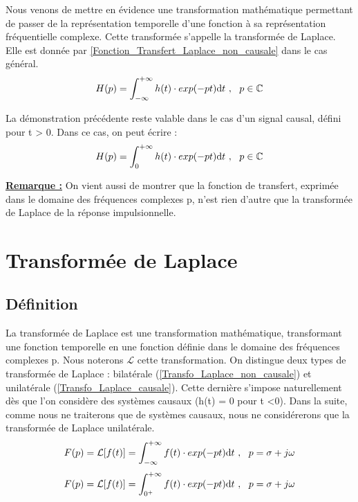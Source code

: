 	Nous venons de mettre en évidence une transformation mathématique permettant de passer de la représentation temporelle d'une fonction à sa représentation fréquentielle complexe. Cette transformée s'appelle la transformée de Laplace. Elle est donnée par \ref{Fonction_Transfert_Laplace_non_causale} dans le cas général.
	\begin{equation}\label{Fonction_Transfert_Laplace_non_causale}
	H(p) = \int_{-\infty}^{+\infty} h(t) \cdot exp(-pt)	\mathrm{d} t~,~~p \in \mathbb{C}	
	\end{equation}	
	
	La démonstration précédente reste valable dans le cas d'un signal causal, défini pour t > 0. Dans ce cas, on peut écrire :
	\begin{equation}\label{Fonction_Transfert_Laplace_causale}
	H(p) = \int_{0}^{+\infty} h(t) \cdot exp(-pt)	\mathrm{d} t~,~~p \in \mathbb{C}	
	\end{equation}
	
	\textbf{\underline{Remarque :}}
	On vient aussi de montrer que la fonction de transfert, exprimée dans le domaine des fréquences complexes p, n'est rien d'autre que la transformée de Laplace de la réponse impulsionnelle.\\
	
	\section{Transformée de Laplace}
	\subsection{Définition}
	La transformée de Laplace est une transformation mathématique, transformant une fonction temporelle en une fonction définie dans le domaine des fréquences complexes p. Nous noterons $\mathcal{L}$ cette transformation. On distingue deux types de transformée de Laplace : bilatérale (\ref{Transfo_Laplace_non_causale}) et unilatérale (\ref{Transfo_Laplace_causale}). Cette dernière s'impose naturellement dès que l'on considère des systèmes causaux (h(t) = 0 pour t <0). Dans la suite, comme nous ne traiterons que de systèmes causaux, nous ne considérerons que la transformée de Laplace unilatérale.
	\begin{equation}\label{Transfo_Laplace_non_causale}
	F(p) = \mathcal{L}[f(t)] = \int_{-\infty}^{+\infty} f(t) \cdot exp(-pt)	\mathrm{d} t~,~~p=\sigma + j \omega	
	\end{equation}
	\begin{equation}\label{Transfo_Laplace_causale}
	F(p) = \mathcal{L}[f(t)] = \int_{0^{+}}^{+\infty} f(t) \cdot exp(-pt)	\mathrm{d} t~,~~p=\sigma + j \omega	
	\end{equation}

